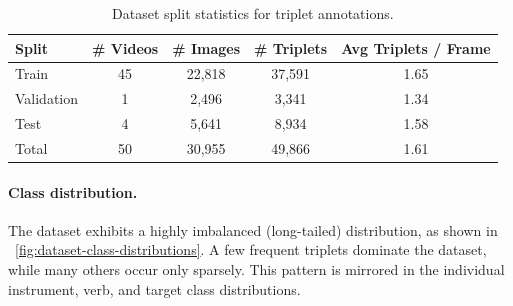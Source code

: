 \documentclass[11pt]{article}
\newcommand{\figref}[1]{\figurename~\ref{#1}}
\begin{document}
\begin{table}[h!]
\centering
\begin{tabular}{lcccc}
\hline
\textbf{Split} & \textbf{\# Videos} & \textbf{\# Images} & \textbf{\# Triplets} & \textbf{Avg Triplets / Frame} \\
\hline
Train & 45 & 22,818 & 37,591 & 1.65 \\
Validation & 1 & 2,496 & 3,341   & 1.34 \\
Test & 4 & 5,641 & 8,934  & 1.58 \\
\hline
Total & 50 & 30,955 & 49,866  & 1.61 \\
\hline
\end{tabular}
\caption{Dataset split statistics for triplet annotations.}
\label{tab:dataset-split-stats}
\end{table}



\paragraph{Class distribution.}
The dataset exhibits a highly imbalanced (long-tailed) distribution, as shown in \figref{fig:dataset-class-distributions}. A few frequent triplets dominate the dataset, while many others occur only sparsely. This pattern is mirrored in the individual instrument, verb, and target class distributions.
\end{document}
